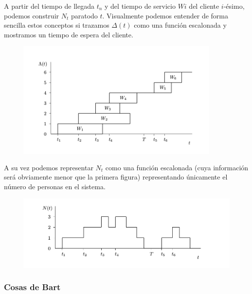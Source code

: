 \documentclass[8pt]{beamer}
\begin{document}
  \begin{frame}
    A partir del tiempo de llegada ${t_n}$ y del tiempo de servicio ${W i}$ del cliente $i$-ésimo, podemos 
    construir ${N_t}$ paratodo $t$. Visualmente podemos entender de forma sencilla estos conceptos si trazamos 
    ${\Delta (t)}$ como una función escalonada y mostramos un tiempo de espera del cliente.

    \begin{figure}[H]
      \begin{center}
        \includegraphics[width=0.9\textwidth]{./imgs/fig1.png}
      \end{center}
    \end{figure}

  \end{frame}

  \begin{frame}
    A su vez podemos representar $N_t$ como una función escalonada (cuya información será obviamente menor que la primera figura) 
    representando únicamente el número de personas en el sistema.

    \begin{figure}[H]
      \begin{center}
        \includegraphics[width=\textwidth]{./imgs/fig2.png}
      \end{center}
    \end{figure}
  \end{frame}
  \begin{frame}\frametitle{Cosas de Bart}
  \end{frame}
\end{document}

